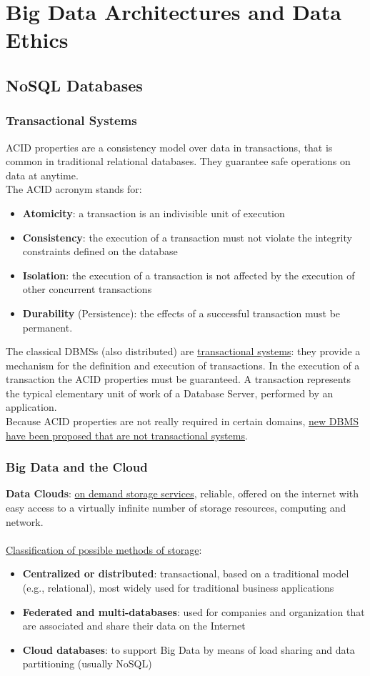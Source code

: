 \documentclass[10pt,a4paper]{article}
\newcommand{\nline}{\\~\\}
\begin{document}
\section{Big Data Architectures and Data Ethics}
\subsection{NoSQL Databases}
\subsubsection{Transactional Systems}
ACID properties are a consistency model over data in transactions, that is common in traditional relational databases. They guarantee safe operations on data at anytime. \\
The ACID acronym stands for:
\begin{itemize}
	\item \textbf{Atomicity}: a transaction is an indivisible unit of execution
	\item \textbf{Consistency}: the execution of a transaction must not violate the integrity constraints
defined on the database
	\item \textbf{Isolation}: the execution of a transaction is not affected by the execution of other
concurrent transactions
	\item \textbf{Durability} (Persistence): the effects of a successful transaction must be permanent.
\end{itemize}
The classical DBMSs (also distributed) are \uline{transactional systems}: they provide a mechanism for the definition and execution of transactions. In the execution of a transaction the ACID properties must be guaranteed. A transaction represents the typical elementary unit of work of a Database Server, performed by an application. \\
Because ACID properties are not really required in certain domains,
\uline{new DBMS have been proposed that are not transactional systems}. 
\subsubsection{Big Data and the Cloud}
\textbf{Data Clouds}: \uline{on demand storage services}, reliable, offered on the internet with easy access to a virtually infinite number of storage resources, computing and network. \nline
\uline{Classification of possible methods of storage}:
\begin{itemize}
	\item \textbf{Centralized or distributed}: transactional, based on a traditional model (e.g., relational), most widely used for traditional business applications
	\item \textbf{Federated and multi-databases}: used for companies and organization that are associated and share their data on the Internet
	\item \textbf{Cloud databases}: to support Big Data by means of load sharing and data partitioning (usually NoSQL)
\end{itemize}
\end{document}
